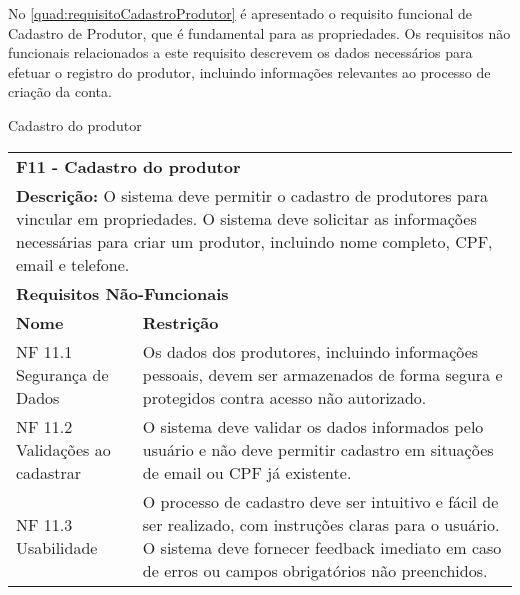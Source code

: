 No \autoref{quad:requisitoCadastroProdutor} é apresentado o requisito funcional de Cadastro de Produtor, que é fundamental para as propriedades. Os requisitos não funcionais relacionados a este requisito descrevem os dados necessários para efetuar o registro do produtor, incluindo informações relevantes ao processo de criação da conta.

\begin{tabframed}[htb]
  \caption{Cadastro do produtor}
  \label{quad:requisitoCadastroProdutor}
  \renewcommand{\arraystretch}{1.5}
  \begin{tabular}{|l|l|}
    \cline{1-2}
    \multicolumn{2}{|l|}{\textbf{F11 - Cadastro do produtor} }
    \\ \cline{1-2}

    \multicolumn{2}{|p{15cm}|}{
    \raggedright \textbf{Descrição:} O sistema deve permitir o cadastro de produtores para vincular em propriedades. O sistema deve solicitar as informações necessárias para criar um produtor, incluindo nome completo, CPF, email e telefone.
    }
    \\ \cline{1-2}

    \multicolumn{2}{|l|}{\textbf{Requisitos Não-Funcionais}}
    \\ \cline{1-2}

    \textbf{Nome}                   &
    \textbf{Restrição}
    \\ \cline{1-2}

    NF 11.1 Segurança de Dados      &
    \multicolumn{1}{|p{8cm}|}{\raggedright Os dados dos produtores, incluindo informações pessoais, devem ser armazenados de forma segura e protegidos contra acesso não autorizado.}
    \\ \cline{1-2}

    NF 11.2 Validações ao cadastrar &
    \multicolumn{1}{|p{8cm}|}{\raggedright O sistema deve validar os dados informados pelo usuário e não deve permitir cadastro em situações de email ou CPF já existente.}
    \\ \cline{1-2}

    NF 11.3 Usabilidade             &
    \multicolumn{1}{|p{8cm}|}{\raggedright O processo de cadastro deve ser intuitivo e fácil de ser realizado, com instruções claras para o usuário. O sistema deve fornecer feedback imediato em caso de erros ou campos obrigatórios não preenchidos.}
    \\ \cline{1-2}
  \end{tabular}
  \fonte{} %
\end{tabframed}

